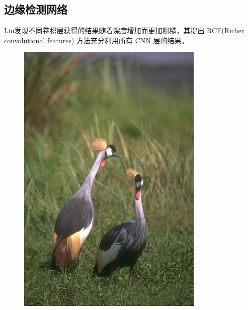 \documentclass[CJK,aspectratio=169]{beamer}  %
\begin{document}
	\subsection{边缘检测网络}
	
	\begin{frame}
		
		{ \yahei Liu\textcolor{blue}{\citep{liu2017richer}}发现不同卷积层获得的结果随着深度增加而更加粗糙，其提出 RCF(Richer convolutional features) 方法充分利用所有 CNN 层的结果。}
		
		\begin{figure}
			\centering
			\setlength{\abovecaptionskip}{-0.05cm} 		
			\begin{minipage}{0.11\columnwidth}
				\includegraphics[width=\linewidth]{picture/LLIE/RCF/origin image}

\end{minipage}
\end{figure}
\end{frame}
\end{document}
